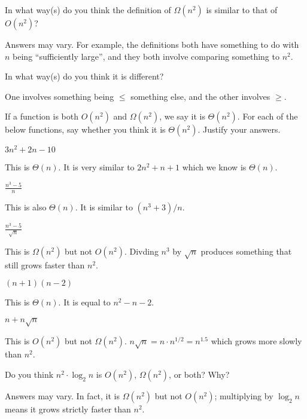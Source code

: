 \documentclass{tufte-handout}
\begin{document}
\begin{questions}
\item In what way(s) do you think the definition of $\Omega(n^2)$ is similar to
  that of $O(n^2)$?
  \begin{answer}
    Answers may vary.  For example, the definitions both have
    something to do with $n$ being ``sufficiently large'', and they
    both involve comparing something to $n^2$.
  \end{answer}
\item In what way(s) do you think it is different?
  \begin{answer}
    One involves something being $\leq$ something else, and the other
    involves $\geq$.
  \end{answer}
\item If a function is both $O(n^2)$ and $\Omega(n^2)$, we say it is
  $\Theta(n^2)$.
  For each of the below functions, say whether you
  think it is $\Theta(n^2)$.  Justify your answers.
  \begin{subquestions}
  \item $3n^2 + 2n - 10$
    \begin{answer}
      This is $\Theta(n)$.  It is very similar to $2n^2 + n + 1$ which
      we know is $\Theta(n)$.
    \end{answer}
  \item $\displaystyle \frac{n^3 - 5}{n}$
    \begin{answer}
      This is also $\Theta(n)$.  It is similar to $(n^3 + 3)/n$.
    \end{answer}
  \item $\displaystyle \frac{n^3 - 5}{\sqrt n}$
    \begin{answer}
      This is $\Omega(n^2)$ but not $O(n^2)$.  Divding $n^3$ by $\sqrt
      n$ produces something that still grows faster than $n^2$.
    \end{answer}
  \item $(n+1)(n-2)$
    \begin{answer}
      This is $\Theta(n)$. It is equal to $n^2 - n - 2$.
    \end{answer}
  \item $n + n \sqrt n$
    \begin{answer}
      This is $O(n^2)$ but not $\Omega(n^2)$.  $n \sqrt n = n \cdot
      n^{1/2} = n^{1.5}$ which grows more slowly than $n^2$.
    \end{answer}
  \end{subquestions}
\item Do you think $n^2 \cdot \log_2 n$ is $O(n^2)$, $\Omega(n^2)$, or
  both?  Why?
  \begin{answer}
    Answers may vary.  In fact, it is $\Omega(n^2)$ but not $O(n^2)$;
    multiplying by $\log_2 n$ means it grows strictly faster than
    $n^2$.
  \end{answer}
\end{questions}
\end{document}
